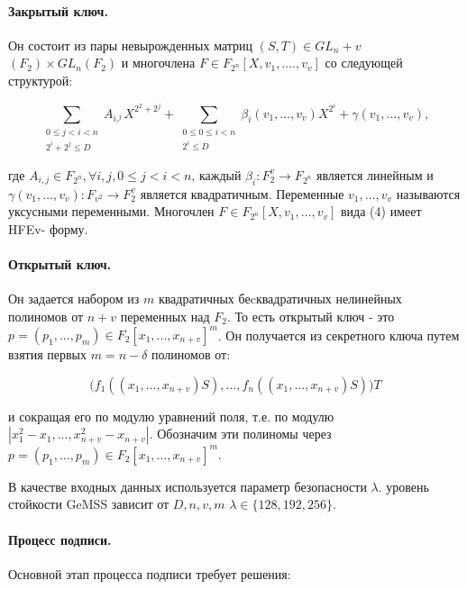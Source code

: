 \paragraph{Закрытый ключ.} Он состоит из пары невырожденных матриц $(S, T) \in GL_n+v$ $(F_2) \times GL_n (F_2)$ и многочлена $F \in F_{2^n} [X, v_1, . . . . , v_v]$ со следующей структурой:

\begin{equation}
\sum_{\substack {0 \leqslant j< i < n \\ 2^i+2^j \leqslant D}} A_{i,^j} X^{2^2+2^j} + \sum_{\substack {0 \leqslant 0 \leqslant i < n \\ 2^i \leqslant D}} \beta_i (v_1,\ldots,v_v) X^{2^i} + \gamma (v_1,\ldots,v_v),
\end{equation}

где $A_{i,j} \in F_{2^n},\forall i,j,0 \leqslant j < i < n$, каждый $\beta_i : F^v_2 \to F_{2^n}$ является линейным и $\gamma (v_1,\ldots,v_v) : F_{v^2} \to F^v_2$ является квадратичным. Переменные $v_1,\ldots, v_v$ называются уксусными переменными. Многочлен $F \in F_{2^n} [X,v_1,\ldots,v_v]$ вида (4) имеет HFEv- форму.

\paragraph{Открытый ключ.} Он задается набором из $m$ квадратичных беcквадратичных нелинейных полиномов от $n + v$ переменных над $F_2$. То есть открытый ключ - это $p = (p_1, . . . , p_m) \in F_2[x_1, . . . , x_{n+v}]^m$. Он получается из секретного ключа путем взятия первых $m = n - \delta$ полиномов от:

\begin{equation}
\bigg ( f_1((x_1,\ldots,x_{n+v})S),\ldots,f_n((x_1,\ldots,x_{n+v})S) \bigg ) T
\end{equation}

и сокращая его по модулю уравнений поля, т.е. по модулю $|x^2_1 - x_1, . . . , x^2_{n+v} - x_{n+v}|$. Обозначим эти полиномы через $p = (p_1,\ldots,p_m) \in F_2[x_1,\ldots,x_{n+v}]^m$.

В качестве входных данных используется параметр безопасности $\lambda$. уровень стойкости GeMSS зависит от $D, n, v, m$ $\lambda \in \{128, 192, 256\}$. 

\paragraph{Процесс подписи.} Основной этап процесса подписи требует решения:

